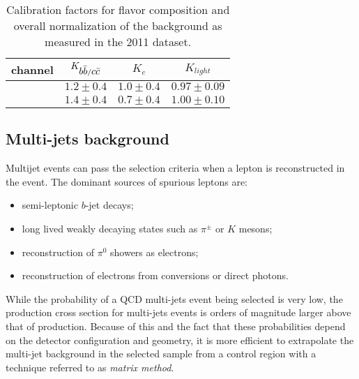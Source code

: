 \begin{table}
  \caption{Calibration factors for flavor composition and overall
    normalization of the \wjets{} background as measured in the 2011 dataset.}
  \label{tab:wsf}
  \centering
  \begin{tabular}{lccc}
    \toprule
    channel   & $K_{\mbox{$b\bar{b}$}{}/\mbox{$c\bar{c}$}{}}$   & $K_{c}$       &
    $K_{light}$ \\
    \midrule
    \mujets{}  & $1.2\pm0.4$            & $1.0\pm0.4$ &
    $0.97\pm0.09$\\ 
    \ejets{}    & $1.4\pm0.4$            & $0.7\pm0.4$ &
    $1.00\pm0.10$\\ 
    \bottomrule
  \end{tabular}
\end{table}

\subsection{Multi-jets background}
\label{sec:qcdbckg}

Multijet events can pass the selection criteria when a lepton is
reconstructed in the event. The dominant sources of spurious leptons
are:
\begin{itemize}
\item semi-leptonic $b$-jet decays;
\item long lived weakly decaying states such as $\pi^{\pm}$ or $K$
  mesons;
\item reconstruction of $\pi^0$ showers as electrons;
\item reconstruction of electrons from conversions or direct photons.
\end{itemize}

While the probability of a QCD multi-jets event being selected is very
low, the production cross section for multi-jets events is orders of
magnitude larger above that of \ttbar{} production.
Because of this and the fact that these probabilities depend on the
detector configuration and geometry, it is more efficient to
extrapolate the multi-jet background in the selected sample from a
control region with a technique referred to as {\it matrix method}.

